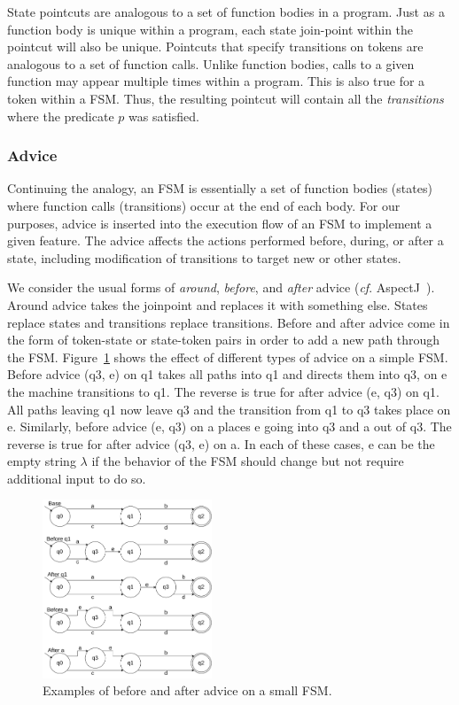 \documentclass[conference]{IEEEtran}
\begin{document}
State pointcuts are analogous to a set of function bodies in a program. Just as a function body is unique within a program, each state join-point within the pointcut will also be unique.  Pointcuts that specify transitions on tokens are analogous to a set of function calls. Unlike function bodies, calls to a given function may appear multiple times within a program. This is also true for a token within a FSM. Thus, the resulting pointcut will contain all the \emph{transitions} where the predicate $p$ was satisfied. 

\subsubsection{Advice}
Continuing the analogy, an FSM is essentially a set of function bodies (states) where function calls (transitions) occur at the end of each body. For our purposes, advice is inserted into the execution flow of an FSM to implement a given feature. The advice affects the actions performed before, during, or after a state, including modification of transitions to target new or other states.

We consider the usual forms of \emph{around}, \emph{before}, and \emph{after} advice (\emph{cf}. AspectJ~\cite{AspectJ:01}). Around advice takes the joinpoint and replaces it with something else. States replace states and transitions replace transitions. Before and after advice come in the form of token-state or state-token pairs in order to add a new path through the FSM. Figure~\ref{fig:adviceExamples} shows the effect of different types of advice on a simple FSM. Before advice (q3, e) on q1 takes all paths into q1 and directs them into q3, on e the machine transitions to q1. The reverse is true for after advice (e, q3) on q1. All paths leaving q1 now leave q3 and the transition from q1 to q3 takes place on e. Similarly, before advice (e, q3) on a places e going into q3 and a out of q3. The reverse is true for after advice (q3, e) on a.  In each of these cases, e can be the empty string $\lambda$ if the behavior of the FSM should change but not require additional input to do so.

\begin{figure}[ht]
    \centering
    \includegraphics[width=0.45\textwidth]{isca2023-latex-template/figures/AdviceExamples.drawio.pdf}
    \caption{Examples of before and after advice on a small FSM.}
    \label{fig:adviceExamples}
\end{figure}
\end{document}
